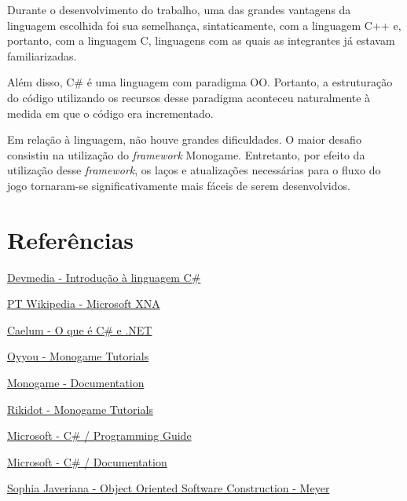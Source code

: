 \documentclass[rel_mlp]{iiufrgs}
\begin{document}
Durante o desenvolvimento do trabalho, uma das grandes vantagens da linguagem escolhida foi sua semelhança, sintaticamente, com a linguagem C++ e, portanto, com a linguagem C, linguagens com as quais as integrantes já estavam familiarizadas.

Além disso, C\# é uma linguagem com paradigma OO. Portanto, a estruturação do código utilizando os recursos desse paradigma aconteceu naturalmente à medida em que o código era incrementado.

Em relação à linguagem, não houve grandes dificuldades. O maior desafio consistiu na utilização do \textit{framework} Monogame. Entretanto, por efeito da utilização desse \textit{framework}, os laços e atualizações necessárias para o fluxo do jogo tornaram-se significativamente mais fáceis de serem desenvolvidos.

%
\chapter{Referências}
%

\href{https://www.devmedia.com.br/introducao-a-linguagem-c/27711}{Devmedia - Introdução à linguagem C\#}

\href{https://pt.wikipedia.org/wiki/Microsoft_XNA}{PT Wikipedia - Microsoft XNA}

\href{https://www.caelum.com.br/apostila-csharp-orientacao-objetos/o-que-e-c-e-net/#2-1-um-pouco-sobre-a-historia-do-c-e-net}{Caelum - O que é C\# e .NET}

\href{https://www.youtube.com/playlist?list=PLV27bZtgVIJqoeHrQq6Mt_S1-Fvq_zzGZ}{Oyyou - Monogame Tutorials}

\href{http://www.monogame.net/documentation/?page=main}{Monogame - Documentation}

\href{http://rbwhitaker.wikidot.com/monogame-tutorials}{Rikidot - Monogame Tutorials}

\href{https://docs.microsoft.com/pt-br/dotnet/csharp/programming-guide/}{Microsoft - C\# / Programming Guide}

\href{https://docs.microsoft.com/en-us/dotnet/csharp/}{Microsoft - C\# / Documentation}

\href{https://sophia.javeriana.edu.co/~cbustaca/docencia/POO-2016-01/documentos/Object%20Oriented%20Software%20Construction-Meyer.pdf}{Sophia Javeriana - Object Oriented Software Construction - Meyer}

%
\end{document}
